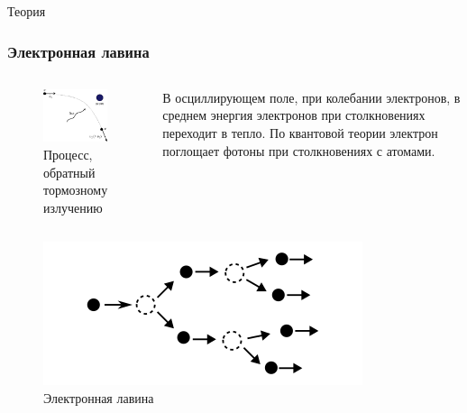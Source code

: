 \documentclass{beamer}
\begin{document}
	
	\begin{frame}[plain,c]
		
		\begin{center}
			\huge {} Теория
		\end{center}
		
	\end{frame}
	
	\begin{frame}
		\frametitle{Электронная лавина}
		
		\begin{columns}
			\begin{figure}
				\centering
				\includegraphics[width=0.7\linewidth]{res/inverse_bremsstrahlung.png}
				\caption*{Процесс, обратный тормозному излучению}
			\end{figure}
			
			В осциллирующем поле, при колебании электронов, в среднем энергия электронов при столкновениях переходит в тепло.
			По квантовой теории электрон поглощает фотоны при столкновениях с атомами.
		\end{columns}
		\begin{columns}
			\column{0.5\linewidth}
			\begin{figure}
				\centering
				\includegraphics[width=0.8\linewidth]{res/electron_avalanche.png}
				\caption*{Электронная лавина}
			\end{figure}
		

\end{columns}
\end{frame}
\end{document}
